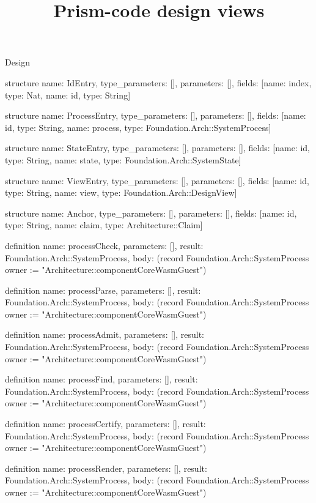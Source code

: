 \begin{lexlean}{Design}
\title{Prism-code design views}
\begin{semanticmodule}
structure{
  name: IdEntry,
  type_parameters: [],
  parameters: [],
  fields: [{name: index, type: Nat}, {name: id, type: String}]
}

structure{
  name: ProcessEntry,
  type_parameters: [],
  parameters: [],
  fields: [{name: id, type: String}, {name: process, type: Foundation.Arch::SystemProcess}]
}

structure{
  name: StateEntry,
  type_parameters: [],
  parameters: [],
  fields: [{name: id, type: String}, {name: state, type: Foundation.Arch::SystemState}]
}

structure{
  name: ViewEntry,
  type_parameters: [],
  parameters: [],
  fields: [{name: id, type: String}, {name: view, type: Foundation.Arch::DesignView}]
}

structure{
  name: Anchor,
  type_parameters: [],
  parameters: [],
  fields: [{name: id, type: String}, {name: claim, type: Architecture::Claim}]
}

definition{
  name: processCheck,
  parameters: [],
  result: Foundation.Arch::SystemProcess,
  body: (record Foundation.Arch::SystemProcess {owner := "Architecture::componentCoreWasmGuest"})
}

definition{
  name: processParse,
  parameters: [],
  result: Foundation.Arch::SystemProcess,
  body: (record Foundation.Arch::SystemProcess {owner := "Architecture::componentCoreWasmGuest"})
}

definition{
  name: processAdmit,
  parameters: [],
  result: Foundation.Arch::SystemProcess,
  body: (record Foundation.Arch::SystemProcess {owner := "Architecture::componentCoreWasmGuest"})
}

definition{
  name: processFind,
  parameters: [],
  result: Foundation.Arch::SystemProcess,
  body: (record Foundation.Arch::SystemProcess {owner := "Architecture::componentCoreWasmGuest"})
}

definition{
  name: processCertify,
  parameters: [],
  result: Foundation.Arch::SystemProcess,
  body: (record Foundation.Arch::SystemProcess {owner := "Architecture::componentCoreWasmGuest"})
}

definition{
  name: processRender,
  parameters: [],
  result: Foundation.Arch::SystemProcess,
  body: (record Foundation.Arch::SystemProcess {owner := "Architecture::componentCoreWasmGuest"})
}


\end{semanticmodule}
\end{lexlean}
